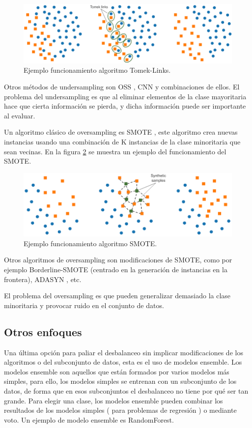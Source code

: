 \begin{figure}[H]
	\centering
	\includegraphics[width=120mm]{imagenes/tomek-example.png}
	\caption{Ejemplo funcionamiento algoritmo Tomek-Links.}
	\label{fig:28}
\end{figure}
\verticalspace

Otros métodos de undersampling son OSS \cite{kubat1997addressing}, CNN \cite{hart1968condensed} y combinaciones de ellos. El problema del undersampling es que al eliminar elementos de la clase mayoritaria hace que cierta información se pierda, y dicha información puede ser importante al evaluar.\newline

Un algoritmo clásico de oversampling es SMOTE \cite{chawla2002smote}, este algoritmo crea nuevas instancias usando una combinación de K instancias de la clase minoritaria que sean vecinas. En la figura \ref{fig:29} se muestra un ejemplo del funcionamiento del SMOTE.\newline

\begin{figure}[H]
	\centering
	\includegraphics[width=120mm]{imagenes/smote-example.png}
	\caption{Ejemplo funcionamiento algoritmo SMOTE.}
	\label{fig:29}
\end{figure}
\verticalspace

Otros algoritmos de oversampling son modificaciones de SMOTE, como por ejemplo Borderline-SMOTE \cite{han2005borderline} (centrado en la generación de instancias en la frontera), ADASYN \cite{he2008adasyn}, etc.\newline

El problema del oversampling es que pueden generalizar demasiado la clase minoritaria y provocar ruido en el conjunto de datos.

\subsection{Otros enfoques}
Una última opción para paliar el desbalanceo sin implicar modificaciones de los algoritmos o del subconjunto de datos, esta es el uso de modelos ensemble. Los modelos ensemble son aquellos que están formados por varios modelos más simples, para ello, los modelos simples se entrenan con un subconjunto de los datos, de forma que en esos subconjuntos el desbalanceo no tiene por qué ser tan grande. Para elegir una clase, los modelos ensemble pueden combinar los resultados de los modelos simples ( para problemas de regresión ) o mediante voto. Un ejemplo de modelo ensemble es RandomForest.